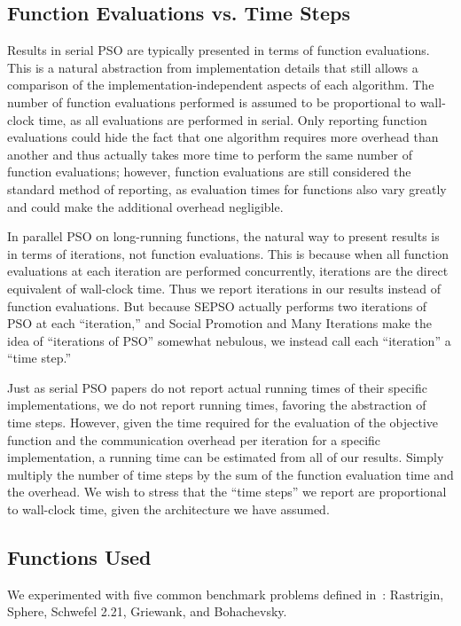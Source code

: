 \documentclass[smallcondensed]{svjour3}
\begin{document}
\subsection{Function Evaluations vs. Time Steps}

Results in serial PSO are typically presented in terms of function evaluations.
This is a natural abstraction from implementation details that still allows a
comparison of the implementation-independent aspects of each algorithm.  The
number of function evaluations performed is assumed to be proportional to
wall-clock time, as all evaluations are performed in serial.  Only reporting
function evaluations could hide the fact that one algorithm requires more
overhead than another and thus actually takes more time to perform the same
number of function evaluations; however, function evaluations are still
considered the standard method of reporting, as evaluation times for functions
also vary greatly and could make the additional overhead negligible.

In parallel PSO on long-running functions, the natural way to present results
is in terms of iterations, not function evaluations.  This is because when all
function evaluations at each iteration are performed concurrently, iterations
are the direct equivalent of wall-clock time.  Thus we report iterations in our
results instead of function evaluations.  But because SEPSO actually performs
two iterations of PSO at each ``iteration,'' and Social Promotion and Many
Iterations make the idea of ``iterations of PSO'' somewhat nebulous, we instead
call each ``iteration'' a ``time step.''

Just as serial PSO papers do not report actual running times of their specific
implementations, we do not report running times, favoring the abstraction of
time steps.  However, given the time required for the evaluation of the
objective function and the communication overhead per iteration for a specific
implementation, a running time can be estimated from all of our results.
Simply multiply the number of time steps by the sum of the function evaluation
time and the overhead.  We wish to stress that the ``time steps'' we report are
proportional to wall-clock time, given the architecture we have assumed.

\subsection{Functions Used}

We experimented with five common benchmark problems defined
in~\citep{herrera-2010-test-suite}: Rastrigin, Sphere, Schwefel 2.21, Griewank,
and Bohachevsky.
\end{document}
